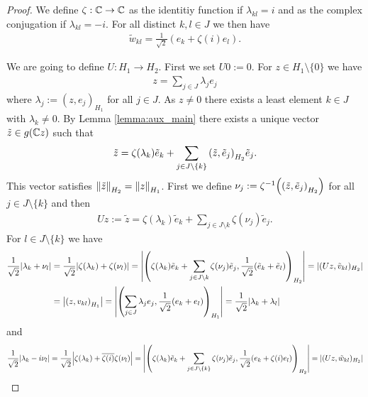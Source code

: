 \begin{proof}
	We define $\zeta: \C \to \C$ as the identitiy function if $\lambda_{kl} = i$ and as the complex conjugation if $\lambda_{kl} = -i$. For all distinct $k,l \in J$ we then have 
	\begin{align*}
		\tilde{w}_{kl} = \frac{1}{\sqrt{2}}(e_k + \zeta(i) e_l).
	\end{align*}
	
	We are going to define $U: H_1 \to H_2$. First we set $U0 := 0$. For $z \in H_1 \setminus \{0\}$ we have
	\begin{align*}
		z = \sum_{j \in J} \lambda_j e_j
	\end{align*}
	where $\lambda_j := (z,e_j)_{H_1}$ for all $j \in J$. As $z \neq 0$ there exists a least element $k \in J$ with $\lambda_k \neq 0$. By Lemma \ref{lemma:aux_main} there exists a unique vector $\tilde{z} \in g(\C z)$ such that
	\begin{align*}
		\tilde{z} = \zeta\pbraces{\lambda_k} \tilde{e}_k + \sum_{j \in J \setminus \{k\}} \pbraces{\tilde{z}, \tilde{e}_j}_{H_2} \tilde{e}_j.
	\end{align*} 
	This vector satisfies $\norm[H_2]{\tilde{z}} = \norm[H_1]{z}$. First we define $\nu_j := \zeta^{-1}\pbraces{\pbraces{\tilde{z}, \tilde{e}_j}_{H_2}}$ for all $j \in J \setminus \{k\}$ and then 
	\begin{align*}
		Uz := \tilde{z} = \zeta(\lambda_k) \tilde{e}_k + \sum_{j \in J \setminus{k}} \zeta(\nu_j) \tilde{e}_j.
	\end{align*}
	For $l \in J \setminus \{k\}$ we have
	\begin{align*}
		\frac{1}{\sqrt{2}}\vbraces{\lambda_k + \nu_l} &= \frac{1}{\sqrt{2}} \vbraces{\zeta(\lambda_k) + \zeta(\nu_l)} = \vbraces{\pbraces{\zeta(\lambda_k) \tilde{e}_k + \sum_{j \in J \setminus{k}} \zeta(\nu_j) \tilde{e}_j, \frac{1}{\sqrt{2}}(\tilde{e}_k + \tilde{e}_l)}_{H_2}} = |(Uz, \tilde{v}_{kl})_{H_2}| \\
		&= \vbraces{\pbraces{z, v_{kl}}_{H_1}} = \vbraces{\pbraces{\sum_{j \in J} \lambda_j e_j, \frac{1}{\sqrt{2}}(e_k + e_l)}_{H_1}} = \frac{1}{\sqrt{2}} \vbraces{\lambda_k + \lambda_l} 
	\end{align*}
	and 
	\begin{align*}
		\frac{1}{\sqrt{2}}\vbraces{\lambda_k - i \nu_l} &= \frac{1}{\sqrt{2}} \vbraces{\zeta(\lambda_k) + \overline{\zeta(i)} \zeta(\nu_l)} = \vbraces{\pbraces{\zeta(\lambda_k) \tilde{e}_k + \sum_{j \in J \setminus \{k\}} \zeta(\nu_j) \tilde{e}_j, \frac{1}{\sqrt{2}}\pbraces{e_k + \zeta(i) e_l}}_{H_2}} = |(Uz, \tilde{w}_{kl})_{H_2}| \\

\end{align*}
\end{proof}
